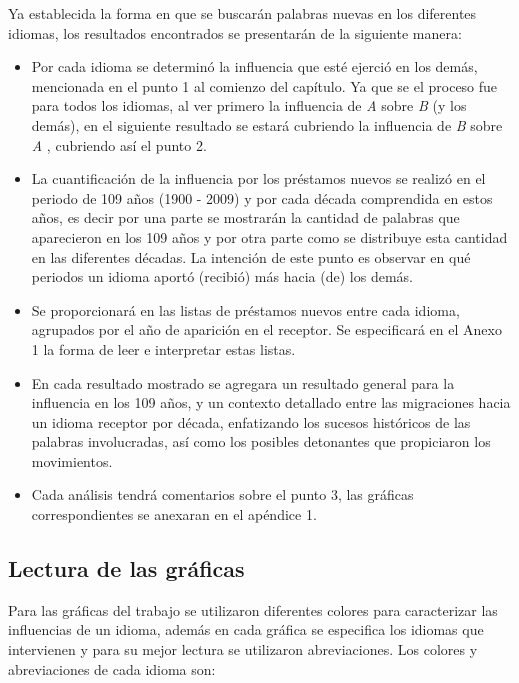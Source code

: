Ya establecida la forma en que se buscarán  palabras nuevas en los diferentes
idiomas,  los resultados encontrados se presentarán de la siguiente manera:
\begin{itemize}
\item Por cada idioma se determinó la influencia que esté ejerció en los demás,
mencionada en el punto 1 al comienzo del capítulo.   Ya que se el proceso fue
para todos los idiomas,  al ver primero la influencia de \textit{A} sobre
\textit{B}  (y los demás),  en el siguiente resultado se estará cubriendo la
influencia  de \textit{B}  sobre \textit{A} , cubriendo así el punto 2. 
\item La cuantificación de la influencia por los préstamos nuevos se realizó en
el periodo de 109 años (1900 - 2009) y por cada década comprendida en estos
años, es decir por una parte se mostrarán la cantidad de palabras que
aparecieron en los 109 años y por otra parte como se distribuye esta cantidad
en las diferentes décadas.  La intención de este punto es observar en qué
periodos un idioma aportó (recibió) más  hacia (de) los demás.
\item Se proporcionará en \cite{prestamos_nuevos} las listas  de préstamos
nuevos entre cada idioma, agrupados por el año de aparición en el receptor.  Se
especificará en el Anexo 1  la forma de leer e interpretar estas listas.
\item En cada resultado mostrado se agregara un resultado general para la
influencia en los 109 años, y un contexto detallado entre las migraciones hacia
un idioma receptor por década,  enfatizando los sucesos históricos de las
palabras involucradas, así como los posibles detonantes que propiciaron los
movimientos. 
\item Cada análisis tendrá comentarios sobre el punto 3,  las gráficas
correspondientes se anexaran en el apéndice 1.
\end{itemize}

\subsection*{Lectura de las gráficas} %

Para las gráficas del trabajo se utilizaron diferentes colores para
caracterizar las influencias de un idioma, además en cada gráfica se especifica
los idiomas que intervienen y para su mejor lectura se utilizaron
abreviaciones. Los colores y abreviaciones de cada idioma son:


